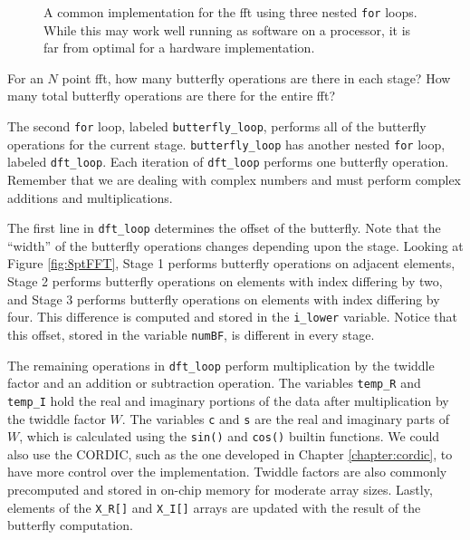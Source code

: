 \begin{figure}

\caption{ A common implementation for the \gls{fft} using three nested \lstinline|for| loops.  While this may work well running as software on a processor, it is far from optimal for a hardware implementation.}
\label{fig:fft_sw}
\end{figure}

\begin{exercise}
For an $N$ point \gls{fft}, how many butterfly operations are there in each stage? How many total butterfly operations are there for the entire \gls{fft}?
\end{exercise}

The second \lstinline|for| loop, labeled \lstinline|butterfly_loop|, performs all of the butterfly operations for the current stage. \lstinline|butterfly_loop| has another nested \lstinline|for| loop, labeled \lstinline|dft_loop|. Each iteration of \lstinline|dft_loop| performs one butterfly operation. Remember that we are dealing with complex numbers and must perform complex additions and multiplications. 

The first line in \lstinline|dft_loop| determines the offset of the butterfly. Note that the ``width'' of the butterfly operations changes depending upon the stage. Looking at Figure \ref{fig:8ptFFT}, Stage 1 performs butterfly operations on adjacent elements, Stage 2 performs butterfly operations on elements with index differing by two, and Stage 3 performs butterfly operations on elements with index differing by four. This difference is computed and stored in the \lstinline|i_lower| variable. Notice that this offset, stored in the variable \lstinline|numBF|, is different in every stage. 

The remaining operations in \lstinline|dft_loop| perform multiplication by the twiddle factor and an addition or subtraction operation. The variables \lstinline|temp_R| and \lstinline|temp_I| hold the real and imaginary portions of the data after multiplication by the twiddle factor $W$. The variables \lstinline|c| and \lstinline|s| are the real and imaginary parts of $W$, which is calculated using the \lstinline|sin()| and \lstinline|cos()| builtin functions. We could also use the CORDIC, such as the one developed in Chapter \ref{chapter:cordic}, to have more control over the implementation. Twiddle factors are also commonly precomputed and stored in on-chip memory for moderate array sizes.  Lastly, elements of the \lstinline|X_R[]| and \lstinline|X_I[]| arrays are updated with the result of the butterfly computation.

